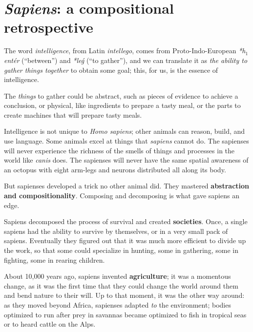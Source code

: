 
\section[Sapiens: a retrospective]{\emph{Sapiens}: a compositional retrospective}

\label{sec:brief-history}

The word \emph{intelligence}, from Latin \emph{intellego}, comes from Proto-Indo-European \emph{*h${}_1$entér} (``between'') and \emph{*leǵ} (``to gather''), and we can translate it as \emph{the ability to gather things together} to obtain some goal;
this, for us, is the essence of intelligence.

The \emph{things} to gather could be abstract, such as pieces of evidence to achieve a conclusion, or physical, like ingredients to prepare a tasty meal, or the parts to create machines that will prepare tasty meals.

Intelligence is not unique to \emph{Homo sapiens}; other animals can reason, build, and use language.
Some animals excel at things that \emph{sapiens} cannot do.
The sapienses will never experience the richness of the smells of things and processes in the world like \emph{canis} does.
The sapienses will never have the same spatial awareness of an octopus with eight arm-legs and neurons distributed all along its body.

But sapienses developed a trick no other animal did.
They mastered \textbf{abstraction and compositionality}.
Composing and decomposing is what gave sapiens an edge.


Sapiens decomposed the process of survival and created \textbf{societies}.
Once, a single sapiens had the ability to survive by themselves, or in a very small pack of sapiens.
Eventually they figured out that it was much more efficient to divide up the work, so that some could specialize in hunting, some in gathering, some in fighting, some in rearing children.

About 10,000 years ago, sapiens invented \textbf{agriculture}; it was a momentous change, as it was the first time that they could change the world around them and bend nature to their will.
Up to that moment, it was the other way around: as they moved beyond Africa, sapienses adapted \emph{to} the environment;
bodies optimized to run after prey in savannas became optimized to fish in tropical seas or to heard cattle on the Alps.

